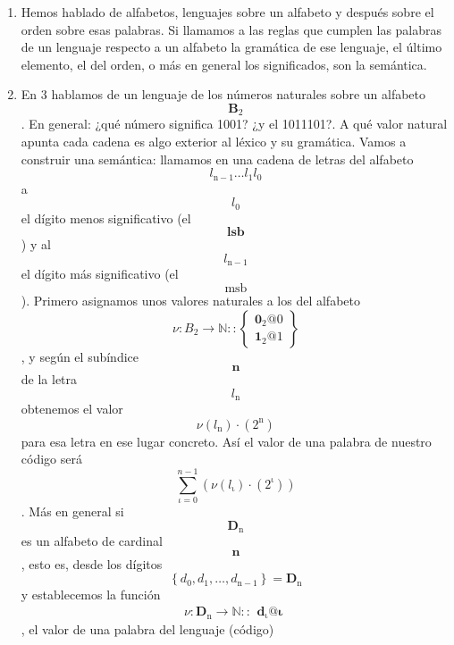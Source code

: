 \begin{enumerate}
\begin{enumerate}
    Podéis ver que en los códigos antes explicitados y sus propiedades
    hacen referencia necesaria a algo más que al conjunto de las
    palabras de un lenguaje, que se puede re\-sumir en un orden en las
    palabras. Esto viene dado normalmente por el significado de las
    palabras.
  \item
    Hemos hablado de alfabetos, lenguajes sobre un alfabeto y después
    sobre el orden sobre esas palabras. Si llamamos a las reglas que
    cumplen las palabras de un lenguaje respecto a un alfabeto la
    gramática de ese lenguaje, el último elemento, el del orden, o más
    en general los significados, son la semántica.
  \item
    En 3 hablamos de un lenguaje de los números naturales sobre un
    alfabeto \[\mathbf{B}_{\mathbf{\mathrm{2}}}\]. En general: ¿qué
    número significa 1001? ¿y el 1011101?. A qué valor natural apunta
    cada cadena es algo exterior al léxico y su gramática. Vamos a
    construir una semánti\-ca: llamamos en una cadena de letras del
    alfabeto
    \[l_{\mathbf{\mathrm{n - 1}}}\ldots l_{\mathbf{\mathrm{1}}}l_{\mathbf{\mathrm{0}}}\]a
    \[l_{\mathbf{\mathrm{0}}}\]el dígito me\-nos significativo
    (el\textbf{\[\mathbf{lsb}\]}) y al\[l_{\mathbf{\mathrm{n - 1}}}\]el
    dígito más significativo (el \textbf{\[\mathbf{\mathrm{msb}}\]}).
    Pri\-mero asignamos unos valores naturales a los del alfabeto
    \[\nu:{B_{\mathbf{\mathrm{2}}}\rightarrow\mathbf{\mathbb{N}}}::\begin{Bmatrix}
    {\mathbf{0_{\mathrm{2}}}@0} \\
    {\mathbf{1_{\mathrm{2}}}@1}
    \end{Bmatrix}\], y según el subíndice \[\mathbf{n}\] de la letra
    \[l_{\mathbf{\mathrm{n}}}\] obtenemos el valor
    \[\nu{{(l_{\mathbf{\mathrm{n}}})} \cdot {(2^{\mathbf{\mathrm{n}}})}}\]
    para esa letra en ese lugar concreto. Así el valor de una palabra de
    nuestro código será
    \[\sum\limits_{\iota = 0}^{n - 1}{({\nu{{(l_{\mathbf{\mathrm{\iota}}})} \cdot {(2^{\mathbf{\mathrm{\iota}}})}}})}\].
    Más en general si \[\mathbf{D}_{\mathbf{\mathrm{n}}}\]es un alfabeto
    de cardinal \[\mathbf{n}\], esto es, desde los dígitos
    \[\left\{ {d_{\mathbf{\mathrm{0}}},d_{\mathbf{\mathrm{1}}},\ldots,d_{\mathbf{\mathrm{n - 1}}}} \right\} = \mathbf{D}_{\mathbf{\mathrm{n}}}\]y
    establecemos la función
    \[\nu:{\mathbf{D}_{\mathbf{\mathrm{n}}}\rightarrow\mathbf{\mathbb{N}}}::\begin{matrix}
    {\mathbf{d_{\mathrm{\iota}}}@\mathbf{\iota}}
    \end{matrix}\], el valor de una palabra del lenguaje (código)

\end{enumerate}
\end{enumerate}

